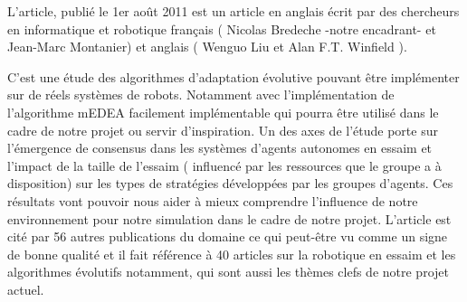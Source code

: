 \documentclass[11pt]{article}
\begin{document}
\begin{flushleft}
L'article, publié le 1er août 2011 est un article en anglais écrit par des chercheurs en informatique et robotique français ( Nicolas Bredeche -notre encadrant- et Jean-Marc Montanier) et anglais ( Wenguo Liu et Alan F.T. Winfield ).

C'est une étude des algorithmes d'adaptation évolutive pouvant être implémenter sur de réels systèmes de robots. Notamment avec l'implémentation de l'algorithme mEDEA facilement implémentable qui pourra être utilisé dans le cadre de notre projet ou servir d'inspiration. Un des axes de l'étude porte sur l'émergence de consensus dans les systèmes d'agents autonomes en essaim et l'impact de la taille de l'essaim ( influencé par les ressources que le groupe a à disposition) sur les types de stratégies développées par les groupes d'agents. Ces résultats vont pouvoir nous aider à mieux comprendre l'influence de notre environnement pour notre simulation dans le cadre de notre projet.
L'article est cité par 56 autres publications du domaine ce qui peut-être vu comme un signe de bonne qualité et il fait référence à 40 articles sur la robotique en essaim et les algorithmes évolutifs notamment, qui sont aussi les thèmes clefs de notre projet actuel.

\end{flushleft}
\end{document}
